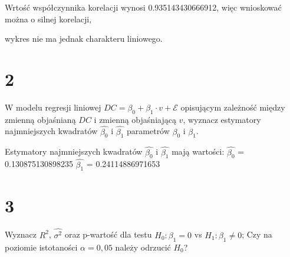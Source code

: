 \documentclass[
  12pt,
]{article}
\newenvironment{Shaded}{\begin{snugshade}}{\end{snugshade}}
\newcommand{\DecValTok}[1]{\textcolor[rgb]{0.00,0.00,0.81}{#1}}
\newcommand{\FunctionTok}[1]{\textcolor[rgb]{0.00,0.00,0.00}{#1}}
\newcommand{\NormalTok}[1]{#1}
\newcommand{\OtherTok}[1]{\textcolor[rgb]{0.56,0.35,0.01}{#1}}
\newcommand{\SpecialCharTok}[1]{\textcolor[rgb]{0.00,0.00,0.00}{#1}}
\begin{document}
Wrtość współczynnika korelacji wynosi 0.935143430666912, więc wnioskować
można o silnej korelacji,

wykres nie ma jednak charakteru liniowego.

\hypertarget{section-1}{%
\section{2}\label{section-1}}

W modelu regresji liniowej
\(DC = \beta_{0} + \beta_{1} \cdot v + \mathcal{E}\) opisującym
zależność między zmienną objaśnianą \(DC\) i zmienną objaśniającą \(v\),
wyznacz estymatory najmniejszych kwadratów \(\hat{\beta_{0}}\) i
\(\hat{\beta_{1}}\) parametrów \(\beta_{0}\) i \(\beta_{1}\).

\begin{Shaded}
\end{Shaded}

Estymatory najmniejszych kwadratów \(\hat{\beta_{0}}\) i
\(\hat{\beta_{1}}\) mają wartości: \(\hat{\beta_{0}}\) =
0.130875130898235 \(\hat{\beta_{1}}\) = 0.24114886971653

\hypertarget{section-2}{%
\section{3}\label{section-2}}

Wyznacz \(R^{2}\), \(\hat{\sigma^{2}}\) oraz p-wartość dla testu
\(H_{0} : \beta_{1} = 0\) vs \(H_{1} : \beta_{1} \neq 0\); Czy na
poziomie istotaności \(\alpha = 0,05\) należy odrzucić \(H_{0}\)?
\end{document}
